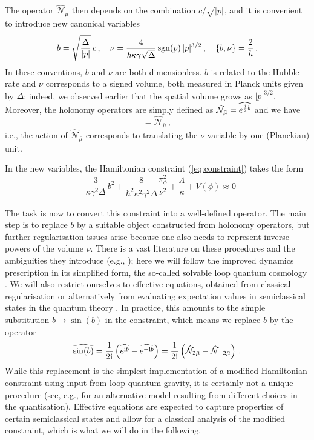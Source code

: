 \documentclass[aps,prd,11pt,showkeys,nofootinbib]{revtex4-2}
\def\im{{\rm i}}
\begin{document}
The operator $\hat{\mathcal{N}}_{\bar\mu}$ then depends on the combination $c/\sqrt{|p|}$, and it is convenient to introduce new canonical variables
\begin{equation}
    b = \sqrt{\frac{\Delta}{|p|}}\,c\,,\quad \nu = \frac{4}{\hbar\kappa\gamma\sqrt{\Delta}}\,{\rm sgn}(p)\,|p|^{3/2}\,,\quad \{b,\nu\}= \frac{2}{\hbar}\,.
    \label{eq:newvariables}
\end{equation}
In these conventions, $b$ and $\nu$ are both dimensionless. $b$ is related to the Hubble rate and $\nu$ corresponds to a signed volume, both measured in Planck units given by $\Delta$; indeed, we observed earlier that the spatial volume grows as $|p|^{3/2}$. Moreover, the holonomy operators are simply defined as $\hat{\mathcal{N}}_{\bar\mu} = \widehat{e^{\frac{{\rm i}}{2}b}}$ and we have
\begin{equation}
  [ \hat\nu, \hat{\mathcal{N}}_{\bar\mu} ] =  \hat{\mathcal{N}}_{\bar\mu}\,,
\end{equation}
i.e., the action of $\hat{\mathcal{N}}_{\bar\mu}$ corresponds to translating the $\nu$ variable by one (Planckian) unit.

In the new variables, the Hamiltonian constraint  (\ref{eq:constraint}) takes the form
\begin{equation}
   -\frac{3}{\kappa\gamma^2\Delta}\,b^2 +\frac{8}{\hbar^2\kappa^2\gamma^2 \Delta} \frac{\pi_\phi^2}{\nu^2}+ \frac{\Lambda}{\kappa} +V(\phi)\approx 0
   \label{eq:newconstraint}
\end{equation}

The task is now to convert this constraint into a well-defined operator. The main step is to replace $b$ by a suitable object constructed from holonomy operators, but further regularisation issues arise because one also needs to represent inverse powers of the volume $\nu$. There is a vast literature on these procedures and the ambiguities they introduce (e.g., \cite{Bojowald:2007ra}); here we will follow the improved dynamics prescription \cite{Banerjee:2011qu,Chiou:2010ne,improve} in its simplified form, the so-called solvable loop quantum cosmology \cite{Ashtekar:2007em}. We will also restrict ourselves to effective equations, obtained from classical regularisation or alternatively from evaluating expectation values in semiclassical states in the quantum theory \cite{Taveras:2008ke}. In practice, this amounts to the simple substitution $b\rightarrow\sin(b)$ in the constraint, which means we replace $b$ by the operator
\begin{equation}
 \widehat{\sin(b)} = \frac{1}{2\im}\left(\widehat{e^{\im b}}-\widehat{e^{-\im b}}\right) = \frac{1}{2\im}\left(\hat{\mathcal{N}}_{2\bar\mu} - \hat{\mathcal{N}}_{-2\bar\mu} \right)\,.
\end{equation}
While this replacement is the simplest implementation of a modified Hamiltonian constraint using input from loop quantum gravity, it is certainly not a unique procedure (see, e.g., \cite{Assanioussi:2018hee} for an alternative model resulting from different choices in the quantisation). 
Effective equations are expected to capture properties of certain semiclassical states and allow for a classical analysis of the modified constraint, which is what we will do in the following.
\end{document}
